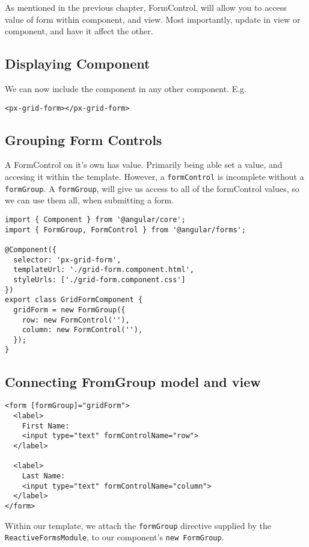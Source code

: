 As mentioned in the previous chapter, FormControl, will allow you to access 
value of form within component, and view. Most importantly, update in view 
or component, and have it affect the other. 

\subsection{ Displaying Component }
We can now include the component in any other component. E.g. 
\begin{lstlisting}[caption=app.component.html]
<px-grid-form></px-grid-form>  
\end{lstlisting}

\subsection{ Grouping Form Controls }
A FormControl on it's own has value. Primarily being able set a value, and
accesing it within the template. However, a \lstinline{formControl} is 
incomplete without a \lstinline{formGroup}. A \lstinline{formGroup}, will give us 
access to all of the formControl values, so we can use them all, when 
submitting a form. 

\begin{lstlisting}
import { Component } from '@angular/core';
import { FormGroup, FormControl } from '@angular/forms';
 
@Component({
  selector: 'px-grid-form',
  templateUrl: './grid-form.component.html',
  styleUrls: ['./grid-form.component.css']
})
export class GridFormComponent {
  gridForm = new FormGroup({
    row: new FormControl(''),
    column: new FormControl(''),
  });
}
\end{lstlisting}

\subsection{ Connecting FromGroup model and view }
\begin{lstlisting}
<form [formGroup]="gridForm">
  <label>
    First Name:
    <input type="text" formControlName="row">
  </label>

  <label>
    Last Name:
    <input type="text" formControlName="column">
  </label>
</form>
\end{lstlisting}
Within our template, we attach the \lstinline{formGroup} directive supplied by
the \lstinline{ReactiveFormsModule}, to our component's \lstinline{new FormGroup}.

